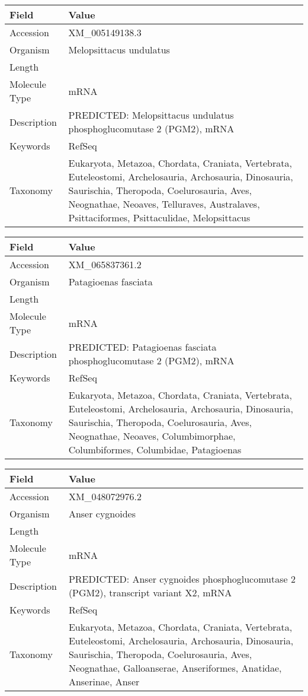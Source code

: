 \documentclass[10pt]{article}
\begin{document}
{\footnotesize
\begin{longtable}{>{\raggedright\arraybackslash}p{4.5cm} >{\raggedright\arraybackslash}p{11.5cm}}
\textbf{Field} & \textbf{Value} \\
\hline
Accession & XM\_005149138.3 \\
Organism & Melopsittacus undulatus \\
Length & 2156 \\
Molecule Type & mRNA \\
Description & PREDICTED: Melopsittacus undulatus phosphoglucomutase 2 (PGM2), mRNA \\
Keywords & RefSeq \\
Taxonomy & Eukaryota, Metazoa, Chordata, Craniata, Vertebrata, Euteleostomi, Archelosauria, Archosauria, Dinosauria, Saurischia, Theropoda, Coelurosauria, Aves, Neognathae, Neoaves, Telluraves, Australaves, Psittaciformes, Psittaculidae, Melopsittacus \\
\end{longtable}
}

{\footnotesize
\begin{longtable}{>{\raggedright\arraybackslash}p{4.5cm} >{\raggedright\arraybackslash}p{11.5cm}}
\textbf{Field} & \textbf{Value} \\
\hline
Accession & XM\_065837361.2 \\
Organism & Patagioenas fasciata \\
Length & 2226 \\
Molecule Type & mRNA \\
Description & PREDICTED: Patagioenas fasciata phosphoglucomutase 2 (PGM2), mRNA \\
Keywords & RefSeq \\
Taxonomy & Eukaryota, Metazoa, Chordata, Craniata, Vertebrata, Euteleostomi, Archelosauria, Archosauria, Dinosauria, Saurischia, Theropoda, Coelurosauria, Aves, Neognathae, Neoaves, Columbimorphae, Columbiformes, Columbidae, Patagioenas \\
\end{longtable}
}

{\footnotesize
\begin{longtable}{>{\raggedright\arraybackslash}p{4.5cm} >{\raggedright\arraybackslash}p{11.5cm}}
\textbf{Field} & \textbf{Value} \\
\hline
Accession & XM\_048072976.2 \\
Organism & Anser cygnoides \\
Length & 2583 \\
Molecule Type & mRNA \\
Description & PREDICTED: Anser cygnoides phosphoglucomutase 2 (PGM2), transcript variant X2, mRNA \\
Keywords & RefSeq \\
Taxonomy & Eukaryota, Metazoa, Chordata, Craniata, Vertebrata, Euteleostomi, Archelosauria, Archosauria, Dinosauria, Saurischia, Theropoda, Coelurosauria, Aves, Neognathae, Galloanserae, Anseriformes, Anatidae, Anserinae, Anser \\
\end{longtable}
}
\end{document}
